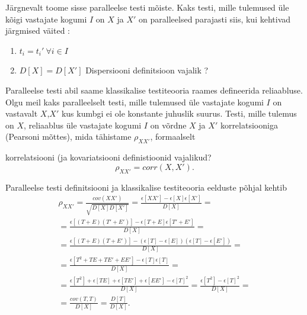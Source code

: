 \documentclass[a4paper]{article}
\numberwithin{equation}{section}
\theoremstyle{definition}
\begin{document}
Järgnevalt toome sisse paralleelse testi mõiste. Kaks testi, mille tulemused \"ule kõigi vastajate kogumi $I$ on $X$ ja $X'$ on paralleelsed parajasti siis, kui kehtivad järgmised väited :
\begin{enumerate}
\item $t_i = t_i' ~ \forall i \in I$
\item $D \left[ X \right] = D \left[ X' \right]$ {\color{cyan} Dispersiooni definitsioon vajalik ? }
\end{enumerate}



Paralleelse testi abil saame klassikalise testiteooria raames defineerida reliaabluse. Olgu meil kaks paralleelselt testi, mille tulemused \"ule vastajate kogumi $I$ on vastavalt $X$,$X'$ kus kumbgi ei ole konstante juhuslik suurus. Testi, mille tulemus on $X$,  reliaablus \"ule vastajate kogumi $I$ on võrdne $X$ ja $X'$ korrelatsiooniga (Pearsoni mõttes), mida tähistame $\rho_{XX'}$, formaalselt

{\color{cyan}korrelatsiooni (ja kovariatsiooni definistioonid vajalikud?}
\begin{equation*}
\rho_{XX'} = corr \left( X,X' \right) \text{.}
\end{equation*} 

Paralleelse testi definitsiooni ja klassikalise testiteooria eelduste põhjal kehtib \begin{gather*}
\rho_{XX'} = \frac{cov(XX')}{\sqrt{D \left[ X \right] D \left[ X' \right]}} =   
\frac{\epsilon \left[XX' \right] - \epsilon \left[X \right] \epsilon \left[ X' \right]}{D \left[ X \right]} = \\ 
= \frac{\epsilon \left[\left(T + E \right) \left( T' + E ' \right) \right] - \epsilon \left[T + E \right] \epsilon \left[ T'+E' \right]}{D \left[ X \right]} = \\
= \frac{\epsilon \left[\left(T + E \right) \left( T + E ' \right) \right] - \left( \epsilon \left[T \right] - \epsilon \left[ E \right] \right) \left( \epsilon \left[ T \right] - \epsilon \left[ E' \right] \right)}{D \left[ X \right]} = \\
= \frac{\epsilon \left[T^2 + TE + TE' + EE'  \right] -  \epsilon \left[T \right]  \epsilon \left[ T \right]}{D \left[ X \right]} = \\
= \frac{\epsilon \left[T^2 \right]  + \epsilon \left[ TE \right] + \epsilon \left[ TE' \right] + \epsilon \left[ EE'  \right] -  \epsilon \left[T \right]^2}{D \left[ X \right]} 
= \frac{\epsilon \left[T^2 \right] - \epsilon \left[ T \right]^2}{D \left [ X \right] } = \\ 
= \frac{cov(T,T)}{D \left[ X \right]} = \frac{D \left[T \right]}{D \left[ X \right]} \text{.}
\end{gather*}
\end{document}
